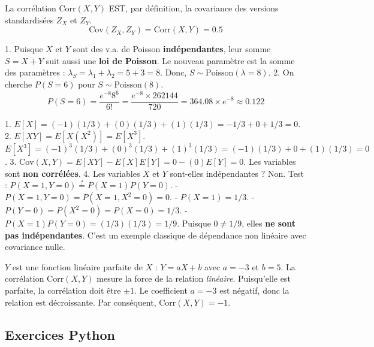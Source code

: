 \begin{correctionbox}
La corrélation $\text{Corr}(X,Y)$ EST, par définition, la covariance des versions standardisées $Z_X$ et $Z_Y$.
$$ \text{Cov}(Z_X, Z_Y) = \text{Corr}(X,Y) = 0.5 $$
\end{correctionbox}

\begin{correctionbox}
1.  Puisque $X$ et $Y$ sont des v.a. de Poisson \textbf{indépendantes}, leur somme $S=X+Y$ suit aussi une \textbf{loi de Poisson}.
    Le nouveau paramètre est la somme des paramètres : $\lambda_S = \lambda_1 + \lambda_2 = 5 + 3 = 8$.
    Donc, $S \sim \text{Poisson}(\lambda=8)$.
2.  On cherche $P(S=6)$ pour $S \sim \text{Poisson}(8)$.
    $$ P(S=6) = \frac{e^{-8} 8^6}{6!} = \frac{e^{-8} \times 262144}{720} = 364.08 \times e^{-8} \approx 0.122 $$
\end{correctionbox}

\begin{correctionbox}
1.  $E[X] = (-1)(1/3) + (0)(1/3) + (1)(1/3) = -1/3 + 0 + 1/3 = 0$.
2.  $E[XY] = E[X(X^2)] = E[X^3]$.
    $E[X^3] = (-1)^3(1/3) + (0)^3(1/3) + (1)^3(1/3) = (-1)(1/3) + 0 + (1)(1/3) = 0$.
3.  $\text{Cov}(X,Y) = E[XY] - E[X]E[Y] = 0 - (0)E[Y] = 0$.
    Les variables sont \textbf{non corrélées}.
4.  Les variables $X$ et $Y$ sont-elles indépendantes ? Non.
    Test : $P(X=1, Y=0) \stackrel{?}{=} P(X=1)P(Y=0)$.
    - $P(X=1, Y=0) = P(X=1, X^2=0) = 0$.
    - $P(X=1) = 1/3$.
    - $P(Y=0) = P(X^2=0) = P(X=0) = 1/3$.
    - $P(X=1)P(Y=0) = (1/3)(1/3) = 1/9$.
    Puisque $0 \neq 1/9$, elles \textbf{ne sont pas indépendantes}.
    C'est un exemple classique de dépendance non linéaire avec covariance nulle.
\end{correctionbox}

\begin{correctionbox}
$Y$ est une fonction linéaire parfaite de $X$ : $Y = aX + b$ avec $a=-3$ et $b=5$.
La corrélation $\text{Corr}(X,Y)$ mesure la force de la relation \textit{linéaire}. Puisqu'elle est parfaite, la corrélation doit être $\pm 1$.
Le coefficient $a = -3$ est négatif, donc la relation est décroissante.
Par conséquent, $\text{Corr}(X,Y) = -1$.
\end{correctionbox}

\subsection{Exercices Python}

